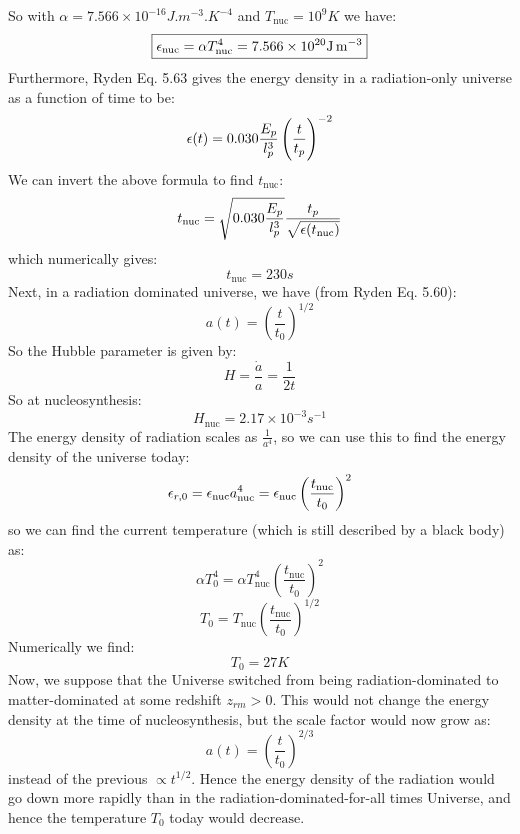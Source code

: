 So with $\alpha = 7.566\times 10^{-16}\si{J.m^{-3}.K^{-4}}$ and $T_{\text{nuc}} = 10^{9}\si{K}$ we have:
\begin{equation}
    \boxed{\e_{\text{nuc}} = \alpha T_{\text{nuc}}^4 = 7.566 \times 10^{20} \si{J.m^{-3}}}
\end{equation}
Furthermore, Ryden Eq. 5.63 gives the energy density in a radiation-only universe as a function of time to be:
\begin{equation}
    \e(t) = 0.030\frac{E_p}{l_p^3}\left(\frac{t}{t_p}\right)^{-2}
\end{equation}
We can invert the above formula to find $t_{\text{nuc}}$:
\begin{equation}
    t_{\text{nuc}} = \sqrt{0.030\frac{E_p}{l_p^3}}\frac{t_p}{\sqrt{\e(t_{\text{nuc}})}}
\end{equation}
which numerically gives:
\begin{equation}
    \boxed{t_{\text{nuc}} = 230\si{s}}
\end{equation}
Next, in a radiation dominated universe, we have (from Ryden Eq. 5.60):
\begin{equation}
    a(t) = \left(\frac{t}{t_0}\right)^{1/2}
\end{equation}
So the Hubble parameter is given by:
\begin{equation}
    H = \frac{\dot{a}}{a} = \frac{1}{2t}
\end{equation}
So at nucleosynthesis:
\begin{equation}
    \boxed{H_{\text{nuc}} = 2.17 \times 10^{-3}\si{s^{-1}}}
\end{equation}
The energy density of radiation scales as $\frac{1}{a^4}$, so we can use this to find the energy density of the universe today:
\begin{equation}
    \e_{r, 0} = \e_{\text{nuc}}a_{\text{nuc}}^4 = \e_{\text{nuc}}\left(\frac{t_{\text{nuc}}}{t_0}\right)^{2}
\end{equation}
so we can find the current temperature (which is still described by a black body) as:
\begin{equation}
    \alpha T_0^4 = \alpha T_{\text{nuc}}^4\left(\frac{t_{\text{nuc}}}{t_0}\right)^{2}
\end{equation}
\begin{equation}
    T_0 =  T_{\text{nuc}}\left(\frac{t_{\text{nuc}}}{t_0}\right)^{1/2}
\end{equation}
Numerically we find:
\begin{equation}
    \boxed{T_0 = 27\si{K}}
\end{equation}
Now, we suppose that the Universe switched from being radiation-dominated to matter-dominated at some redshift $z_{rm} > 0$. This would not change the energy density at the time of nucleosynthesis, but the scale factor would now grow as:
\begin{equation}
    a(t) = \left(\frac{t}{t_0}\right)^{2/3}
\end{equation}
instead of the previous $\propto t^{1/2}$. Hence the energy density of the radiation would go down more rapidly than in the radiation-dominated-for-all times Universe, and hence the temperature $T_0$ today would $\boxed{\text{decrease}}$.